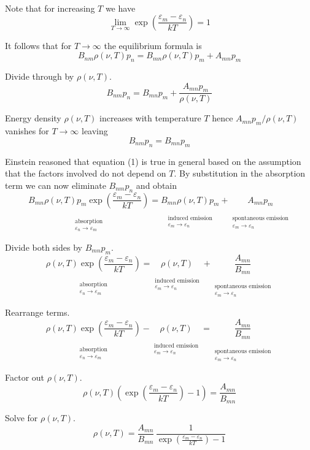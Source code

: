 \documentclass[12pt]{article}
\newcommand\BNM{B_{nm}} %
\newcommand\BMN{B_{mn}} %
\newcommand\AMN{A_{mn}} %
\newcommand\RHO{\rho(\nu,T)}
\newcommand\ABSORPTION{\substack{\phantom{0}\\ \text{absorption}\\ \varepsilon_n\rightarrow\varepsilon_m}}
\newcommand\INDUCED{\substack{\phantom{0}\\ \text{induced emission}\\ \varepsilon_m\rightarrow\varepsilon_n}}
\newcommand\SPONTANEOUS{\substack{\phantom{0}\\ \text{spontaneous emission}\\ \varepsilon_m\rightarrow\varepsilon_n}}
\begin{document}
\noindent
Note that for increasing $T$ we have
\begin{equation*}
\lim_{T\rightarrow\infty}\exp\left(\frac{\varepsilon_m-\varepsilon_n}{kT}\right)=1
\end{equation*}

\noindent
It follows that for $T\rightarrow\infty$ the equilibrium formula is
\begin{equation*}
\BNM\RHO p_n
=\BMN\RHO p_m
+\AMN p_m
\end{equation*}

\noindent
Divide through by $\RHO$.
\begin{equation*}
\BNM p_n=\BMN p_m+\frac{\AMN p_m}{\RHO}
\end{equation*}

\noindent
Energy density $\RHO$ increases with temperature $T$
hence $\AMN p_m/\RHO$ vanishes for $T\rightarrow\infty$ leaving
\begin{equation*}
\BNM p_n=\BMN p_m
\tag{1}
\end{equation*}

\noindent
Einstein reasoned that equation (1) is true in general based on the assumption that
the factors involved do not depend on $T$.
By substitution in the absorption term we can now eliminate $\BNM p_n$ and obtain
\begin{equation*}
\underset{\ABSORPTION}{\BMN\RHO p_m\exp\left(\frac{\varepsilon_m-\varepsilon_n}{kT}\right)}
=\underset{\INDUCED}{\BMN\RHO p_m}
+\underset{\SPONTANEOUS}{\AMN p_m}
\end{equation*}

\noindent
Divide both sides by $\BMN p_m$.
\begin{equation*}
\underset{\ABSORPTION}{\RHO\exp\left(\frac{\varepsilon_m-\varepsilon_n}{kT}\right)}
=\underset{\INDUCED}{\RHO}+\underset{\SPONTANEOUS}{\frac{\AMN}{\BMN}}
\end{equation*}

\noindent
Rearrange terms.
\begin{equation*}
\underset{\ABSORPTION}{\RHO\exp\left(\frac{\varepsilon_m-\varepsilon_n}{kT}\right)}
-\underset{\INDUCED}{\RHO}=\underset{\SPONTANEOUS}{\frac{\AMN}{\BMN}}
\end{equation*}

\noindent
Factor out $\RHO$.
\begin{equation*}
\RHO\left(\exp\left(\frac{\varepsilon_m-\varepsilon_n}{kT}\right)-1\right)
=\frac{\AMN}{\BMN}
\end{equation*}

\noindent
Solve for $\RHO$.
\begin{equation*}
\RHO
=\frac{\AMN}{\BMN}\,\frac{1}{\exp\left(\frac{\varepsilon_m-\varepsilon_n}{kT}\right)-1}
\end{equation*}
\end{document}
